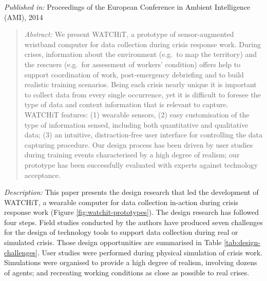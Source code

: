 \emph{Published in:} Proceedings of the European Conference in Ambient Intelligence (AMI), 2014 

\begin{quote}
\emph{Abstract:} We present WATCHiT, a prototype of sensor-augmented wristband computer for data collection during crisis response work. During crises, information about the environment (e.g.~to map the territory) and the rescuers (e.g.~for assessment of workers' condition) offers help to support coordination of work, post-emergency debriefing and to build realistic training scenarios. Being each crisis nearly unique it is important to collect data from every single occurrence, yet it is difficult to foresee the type of data and context information that is relevant to capture. WATCHiT features: (1) wearable sensors, (2) easy customisation of the type of information sensed, including both quantitative and qualitative data; (3) an intuitive, distraction-free user interface for controlling the data capturing procedure. Our design process has been driven by user studies during training events characterised by a high degree of realism; our prototype has been successfully evaluated with experts against technology acceptance. 
\end{quote}

\emph{Description:} This paper presents the design research that led the development of WATCHiT, a wearable computer for data collection in-action during crisis response work (Figure \ref{fig:watchit-prototypes}). The design research has followed four steps. Field studies conducted by the authors have produced seven challenges for the design of technology tools to support data collection during real or simulated crisis. Those design opportunities are summarised in Table \ref{tab:design-challenges}. User studies were performed during physical simulation of crisis work. Simulations were organised to provide a high degree of realism, involving dozens of agents; and recreating working conditions as close as possible to real crises.

